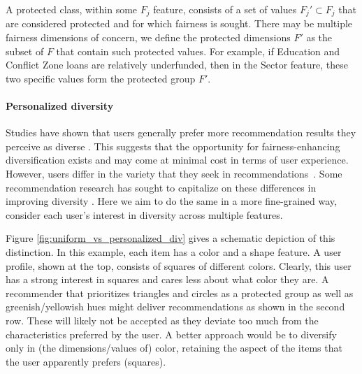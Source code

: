 A protected class, within some $F_j$ feature, consists of a set of values $F_j' \subset F_j$ that are considered protected and for which fairness is sought. There may be multiple fairness dimensions of concern, we define the protected dimensions  $F'$ as the subset of $F$ that contain such protected values. For example, if Education and Conflict Zone loans are relatively underfunded, then in the Sector feature, these two specific values form the protected group $F'$. 

\noindent\paragraph{\textbf{Personalized diversity}}
\newline
\indent Studies have shown that users generally prefer more recommendation results they perceive as diverse \cite{hu2011enhancing}. This suggests that the opportunity for fairness-enhancing diversification exists and may come at minimal cost in terms of user experience. However, users differ in the variety that they seek in recommendations~\cite{tintarev2013adapting}. Some recommendation research has sought to capitalize on these differences in improving diversity \cite{eskandanianuser_2016}. Here we aim to do the same in a more fine-grained way, consider each user's interest in diversity across multiple features.

Figure \ref{fig:uniform_vs_personalized_div} gives a schematic depiction of this distinction. In this example, each item has a color and a shape feature. A user profile, shown at the top, consists of squares of different colors. Clearly, this user has a strong interest in squares and cares less about what color they are. A recommender that prioritizes triangles and circles as a protected group as well as greenish/yellowish hues might deliver recommendations as shown in the second row. These will likely not be accepted as they deviate too much from the characteristics preferred by the user. A better approach would be to diversify only in (the dimensions/values of) color, retaining the aspect of the items that the user apparently prefers (squares).

